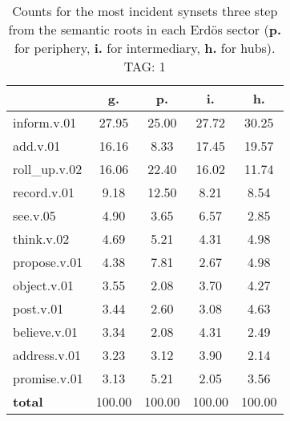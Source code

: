\begin{table}[h!]
\begin{center}
\begin{tabular}{| l | c | c | c | c |}\hline
 & g. & p. & i. & h. \\\hline
inform.v.01 & 27.95  & 25.00  & 27.72  & 30.25 \\\hline
add.v.01 & 16.16  & 8.33  & 17.45  & 19.57 \\\hline
roll\_up.v.02 & 16.06  & 22.40  & 16.02  & 11.74 \\\hline
record.v.01 & 9.18  & 12.50  & 8.21  & 8.54 \\\hline
see.v.05 & 4.90  & 3.65  & 6.57  & 2.85 \\\hline
think.v.02 & 4.69  & 5.21  & 4.31  & 4.98 \\\hline
propose.v.01 & 4.38  & 7.81  & 2.67  & 4.98 \\\hline
object.v.01 & 3.55  & 2.08  & 3.70  & 4.27 \\\hline
post.v.01 & 3.44  & 2.60  & 3.08  & 4.63 \\\hline
believe.v.01 & 3.34  & 2.08  & 4.31  & 2.49 \\\hline
address.v.01 & 3.23  & 3.12  & 3.90  & 2.14 \\\hline
promise.v.01 & 3.13  & 5.21  & 2.05  & 3.56 \\\hline
{{\bf total}} & 100.00  & 100.00  & 100.00  & 100.00 \\\hline
\end{tabular}
\caption{Counts for the most incident synsets three step from the semantic roots in each Erd\"os sector ({\bf p.} for periphery, {\bf i.} for intermediary, {\bf h.} for hubs). TAG: 1}
\end{center}
\end{table}